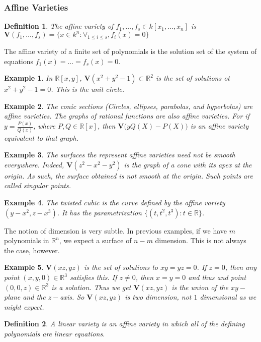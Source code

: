 \documentclass{article}
\theoremstyle{mystyle}
\newtheorem{definition}{Definition}[section]
\newtheorem{example}{Example}[section]
\begin{document}
\subsubsection{Affine Varieties}
\begin{definition}
The affine variety of $f_1,\hdots, f_s \in k[x_1,\hdots ,x_n]$ is $\mathbf{V}(f_1,\hdots, f_s) = \{x\in k^n:\forall_{1\leq i \leq s},f_i(x) = 0\}$
\end{definition}
The affine variety of a finite set of polynomials is the solution set of the system of equations $f_1(x) = \hdots = f_s(x) = 0$. 
\begin{example}
In $\mathbb{R}[x,y]$, $\mathbf{V}(x^2+y^2-1) \subset \mathbb{R}^2$ is the set of solutions ot $x^2+y^2-1 = 0$. This is the unit circle.
\end{example}
\begin{example}
The conic sections (Circles, ellipses, parabolas, and hyperbolas) are affine varieties. The graphs of rational functions are also affine varieties. For if $y = \frac{P(x)}{Q(x)}$, where $P,Q\in \mathbb{R}[x]$, then $\mathbf{V}\big(yQ(X)-P(X)\big)$ is an affine variety equivalent to that graph.
\end{example}
\begin{example}
The surfaces the represent affine varieties need not be smooth everywhere. Indeed, $\mathbf{V}(z^2-x^2-y^2)$ is the graph of a cone with its apex at the origin. As such, the surface obtained is not smooth at the origin. Such points are called singular points.
\end{example}
\begin{example}
The twisted cubic is the curve defined by the affine variety $(y-x^2,z-x^3)$. It has the parametrization $\{(t,t^2,t^3):t\in \mathbb{R}\}$.
\end{example}
The notion of dimension is very subtle. In previous examples, if we have $m$ polynomials in $\mathbb{R}^n$, we expect a surface of $n-m$ dimension. This is not always the case, however.
\begin{example}
$\mathbf{V}(xz,yz)$ is the set of solutions to $xy=yz = 0$. If $z = 0$, then any point $(x,y,0)\in \mathbb{R}^3$ satisfies this. If $z\ne 0$, then $x=y=0$ and thus and point $(0,0,z)\in \mathbb{R}^3$ is a solution. Thus we get $\mathbf{V}(xz,yz)$ is the union of the $xy-$plane and the $z-$axis. So $\mathbf{V}(xz,yz)$ is two dimension, not $1$ dimensional as we might expect.
\end{example}
\begin{definition}
A linear variety is an affine variety in which all of the defining polynomials are linear equations.
\end{definition}
\end{document}
